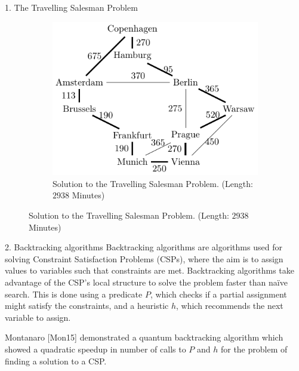 \documentclass[]{templates/poster}
\begin{document}
\begin{frame}{}
\begin{columns}[t]
\begin{column}{0.422\linewidth}
\begin{block}{\Large 1. The Travelling Salesman Problem}
\begin{center}
\begin{figure}
\begin{subfigure}[t]{0.3\linewidth}
  \includegraphics[width=\linewidth]{shortest}
  \caption{ Solution to the Travelling Salesman Problem. (Length: $2938$ Minutes)}
  \end{subfigure}
  \end{figure}
  \end{center}
  \end{block}

  \begin{block}{\Large 2. Backtracking algorithms}
  Backtracking algorithms are algorithms used for solving Constraint Satisfaction Problems (CSPs), where the aim is to assign values to variables such that constraints are met. Backtracking algorithms take advantage of the CSP's local structure to solve the problem faster than na\"ive search. This is done using a predicate $P$, which checks if a partial assignment might satisfy the constraints, and a heuristic $h$, which recommends the next variable to assign.
  
  Montanaro [Mon15] demonstrated a quantum backtracking algorithm which showed a quadratic speedup in number of calls to $P$ and $h$ for the problem of finding a solution to a CSP.
  \end{block}
  \end{column}


\end{columns}
\end{frame}
\end{document}
